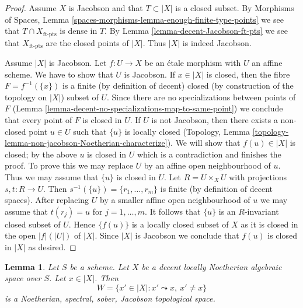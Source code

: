 \documentclass{stacks-project}
\theoremstyle{plain}
\newtheorem{lemma}[subsection]{Lemma}
\theoremstyle{definition}
\theoremstyle{remark}
\numberwithin{equation}{subsection}
\begin{document}
\begin{proof}
Assume $X$ is Jacobson and that $T \subset |X|$ is a closed subset.
By Morphisms of Spaces, Lemma
\ref{spaces-morphisms-lemma-enough-finite-type-points}
we see that $T \cap X_{\text{ft-pts}}$ is dense in $T$.
By Lemma \ref{lemma-decent-Jacobson-ft-pts} we see that
$X_{\text{ft-pts}}$ are the
closed points of $|X|$. Thus $|X|$ is indeed Jacobson.

\medskip\noindent
Assume $|X|$ is Jacobson. Let $f : U \to X$ be an \'etale
morphism with $U$ an affine scheme. We have to show that $U$
is Jacobson. If $x \in |X|$ is closed,
then the fibre $F = f^{-1}(\{x\})$ is a finite (by definition of
decent) closed (by construction of the topology on $|X|$) subset of $U$.
Since there are no specializations between points of $F$
(Lemma \ref{lemma-decent-no-specializations-map-to-same-point})
we conclude that every point of $F$ is closed in $U$.
If $U$ is not Jacobson, then there exists a non-closed point
$u \in U$ such that $\{u\}$ is locally closed (Topology, Lemma
\ref{topology-lemma-non-jacobson-Noetherian-characterize}).
We will show that $f(u) \in |X|$ is closed; by the above $u$
is closed in $U$ which is a contradiction and finishes
the proof. To prove this we may replace $U$ by an affine open
neighbourhood of $u$.
Thus we may assume that $\{u\}$ is closed in $U$.
Let $R = U \times_X U$ with projections $s, t : R \to U$.
Then $s^{-1}(\{u\}) = \{r_1, \ldots, r_m\}$ is finite (by
definition of decent spaces). After replacing $U$ by a smaller affine
open neighbourhood of $u$ we may assume that $t(r_j) = u$ for
$j = 1, \ldots, m$. It follows that $\{u\}$ is an $R$-invariant
closed subset of $U$. Hence $\{f(u)\}$ is a locally closed subset
of $X$ as it is closed in the open $|f|(|U|)$ of $|X|$. Since $|X|$
is Jacobson we conclude that $f(u)$ is closed in $|X|$ as desired.
\end{proof}

\begin{lemma}
\label{lemma-punctured-spec}
Let $S$ be a scheme. Let $X$ be a decent locally Noetherian algebraic
space over $S$. Let $x \in |X|$. Then
$$
W = \{x' \in |X| : x' \leadsto x,\ x' \not = x\}
$$
is a Noetherian, spectral, sober, Jacobson topological space.
\end{lemma}
\end{document}
